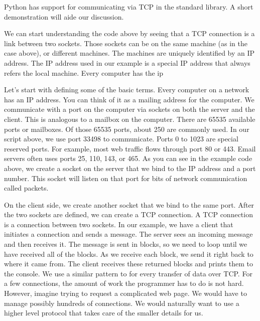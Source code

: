Python has support for communicating via TCP in the standard library.
A short demonstration will aide our discussion.




We can start understanding the code above by seeing that a TCP connection is a link between two sockets.
Those sockets can be on the same machine (as in the case above), or different machines.
The machines are uniquely identified by an IP address.
The IP address used in our example is a special IP address that always refers the local machine.
Every computer has the ip


Let's start with defining some of the basic terms.
Every computer on a network has an IP address.
You can think of it as a mailing address for the computer.
We communicate with a port on the computer via sockets on both the server and the client.
This is analogous to a mailbox on the computer.
There are 65535 available ports or mailboxes.
Of those 65535 ports, about 250 are commonly used.
In our script above, we use port 33498 to communicate.
Ports 0 to 1023 are special reserved ports.
For example, most web traffic flows through port 80 or 443.
Email servers often uses ports 25, 110, 143, or 465.
As you can see in the example code above, we create a socket on the server that we bind to the IP address and a port number.
This socket will listen on that port for bits of network communication called packets.

On the client side, we create another socket that we bind to the same port.
After the two sockets are defined, we can create a TCP connection.
A TCP connection is a connection between two sockets.
In our example, we have a client that initiates a connection and sends a message.
The server sees an incoming message and then receives it.
The message is sent in blocks, so we need to loop until we have received all of the blocks.
As we receive each block, we send it right back to where it came from.
The client receives these returned blocks and prints them to the console.
We use a similar pattern to for every transfer of data over TCP.
For a few connections, the amount of work the programmer has to do is not hard.
However, imagine trying to request a complicated web page.
We would have to manage possibly hundreds of connections.
We would naturally want to use a higher level protocol that takes care of the smaller details for us.

